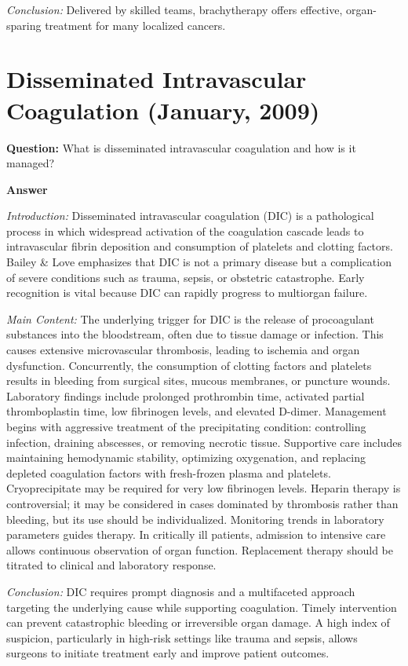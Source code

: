 \documentclass{article}
\begin{document}
\emph{Conclusion:} Delivered by skilled teams, brachytherapy offers effective, organ-sparing treatment for many localized cancers.

\section{Disseminated Intravascular Coagulation (January, 2009)}


\textbf{Question:} What is disseminated intravascular coagulation and how is it managed?

\textbf{Answer}

\emph{Introduction:} Disseminated intravascular coagulation (DIC) is a pathological process in which widespread activation of the coagulation cascade leads to intravascular fibrin deposition and consumption of platelets and clotting factors. Bailey \& Love emphasizes that DIC is not a primary disease but a complication of severe conditions such as trauma, sepsis, or obstetric catastrophe. Early recognition is vital because DIC can rapidly progress to multiorgan failure.

\emph{Main Content:} The underlying trigger for DIC is the release of procoagulant substances into the bloodstream, often due to tissue damage or infection. This causes extensive microvascular thrombosis, leading to ischemia and organ dysfunction. Concurrently, the consumption of clotting factors and platelets results in bleeding from surgical sites, mucous membranes, or puncture wounds. Laboratory findings include prolonged prothrombin time, activated partial thromboplastin time, low fibrinogen levels, and elevated D-dimer. Management begins with aggressive treatment of the precipitating condition: controlling infection, draining abscesses, or removing necrotic tissue. Supportive care includes maintaining hemodynamic stability, optimizing oxygenation, and replacing depleted coagulation factors with fresh-frozen plasma and platelets. Cryoprecipitate may be required for very low fibrinogen levels. Heparin therapy is controversial; it may be considered in cases dominated by thrombosis rather than bleeding, but its use should be individualized. Monitoring trends in laboratory parameters guides therapy. In critically ill patients, admission to intensive care allows continuous observation of organ function. Replacement therapy should be titrated to clinical and laboratory response.

\emph{Conclusion:} DIC requires prompt diagnosis and a multifaceted approach targeting the underlying cause while supporting coagulation. Timely intervention can prevent catastrophic bleeding or irreversible organ damage. A high index of suspicion, particularly in high-risk settings like trauma and sepsis, allows surgeons to initiate treatment early and improve patient outcomes.
\end{document}

